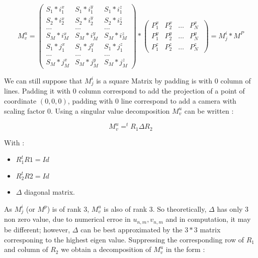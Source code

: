 \begin{equation}
   M^u_v= \left( \begin{array}{ccc} 
             S_1*i^x_1 & S_1*i^y_1 & S_1*i^z_1 \\
             S_2*i^x_2 & S_2*i^y_2 & S_2*i^z_2 \\
             \dots & \dots & \dots \\
             S_M*i^x_M & S_M*i^y_M & S_M*i^z_M \\
             S_1*j^x_1 & S_1* j^y_1 & S_1* j^z_1 \\
             \dots & \dots & \dots \\
             S_M*j^x_M & S_M*j^y_M & S_M*j^z_M 
        \end{array} 
\right)
       *
        \left( \begin{array}{cccc} 
             P^x_1 & P^x_2 &  \dots & P^x_N \\
             P^y_1 & P^y_2 &  \dots & P^y_N \\
             P^z_1 & P^z_2 &  \dots & P^z_N \
        \end{array} 
        \right)
     = M^i_j * M^P
    \label{TomKanFactMUV}
\end{equation}



We can still
suppose that $M^i_j$ is a square Matrix by padding is with $0$ column of lines.
Padding it with $0$ column correspond to add the projection of a point of coordinate
 $(0,0,0)$, padding with $0$ line correspond to add a camera with scaling factor $0$.
Using a singular value decomposition $M^u_v$ can be written :


\begin{equation}
   M^u_v=   ^t R_1 \Delta R_2
\end{equation}

With  :

\begin{itemize}
   \item  $R_1 ^t R1 = Id$  
   \item  $R_2 ^t R2 = Id$  
   \item  $\Delta$ diagonal matrix.
\end{itemize}

As $M^i_j$ (or $M^p$) is of rank $3$, $M^u_v$ is also of rank $3$.  So  theoretically, $\Delta$  has only $3$
non zero value, due to numerical erroe in $u_{n,m},v_{n,m}$ and in computation, it may be different; however,
 $\Delta$  can be best approximated by the $3*3$ matrix corresponing to the highest eigen value. Suppressing
the corresponding row of $R_1$ and column of $R_2$ we obtain a
decomposition of $M^u_v$ in the form :

